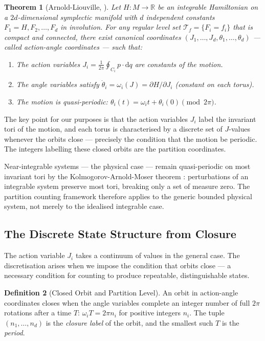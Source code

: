 \documentclass[twocolumn,10pt,a4paper]{article}
\theoremstyle{thmstyle}
\newtheorem{theorem}{Theorem}[section]
\theoremstyle{definition}
\newtheorem{definition}[theorem]{Definition}
\theoremstyle{remark}
\newcommand{\R}{\mathbb{R}}
\begin{document}
\begin{theorem}[Arnold-Liouville, \citealp{arnold1989}]
\label{thm:al}
Let $H : M \to \R$ be an integrable Hamiltonian on a $2d$-dimensional symplectic manifold with $d$ independent constants $F_1 = H, F_2, \ldots, F_d$ in involution. For any regular level set $\mathcal{T}_f = \{F_i = f_i\}$ that is compact and connected, there exist canonical coordinates $(J_1,\ldots,J_d, \theta_1,\ldots,\theta_d)$ --- called action-angle coordinates --- such that:
\begin{enumerate}[leftmargin=1.5em,itemsep=0.2em]
\item The action variables $J_i = \frac{1}{2\pi}\oint_{C_i} p \cdot \mathrm{d}q$ are constants of the motion.
\item The angle variables satisfy $\dot{\theta}_i = \omega_i(J) = \partial H / \partial J_i$ (constant on each torus).
\item The motion is quasi-periodic: $\theta_i(t) = \omega_i t + \theta_i(0) \pmod{2\pi}$.
\end{enumerate}
\end{theorem}

The key point for our purposes is that the action variables $J_i$ label the invariant tori of the motion, and each torus is characterised by a discrete set of $J$-values whenever the orbits close --- precisely the condition that the motion be periodic. The integers labelling these closed orbits are the partition coordinates.

Near-integrable systems --- the physical case --- remain quasi-periodic on most invariant tori by the Kolmogorov-Arnold-Moser theorem \citep{kolmogorov1954,arnold1963,moser1962}: perturbations of an integrable system preserve most tori, breaking only a set of measure zero. The partition counting framework therefore applies to the generic bounded physical system, not merely to the idealised integrable case.

\subsection{The Discrete State Structure from Closure}

The action variable $J_i$ takes a continuum of values in the general case. The discretisation arises when we impose the condition that orbits close --- a necessary condition for counting to produce repeatable, distinguishable states.

\begin{definition}[Closed Orbit and Partition Level]
\label{def:closure}
An orbit in action-angle coordinates closes when the angle variables complete an integer number of full $2\pi$ rotations after a time $T$: $\omega_i T = 2\pi n_i$ for positive integers $n_i$. The tuple $(n_1, \ldots, n_d)$ is the \emph{closure label} of the orbit, and the smallest such $T$ is the \emph{period}.
\end{definition}
\end{document}
